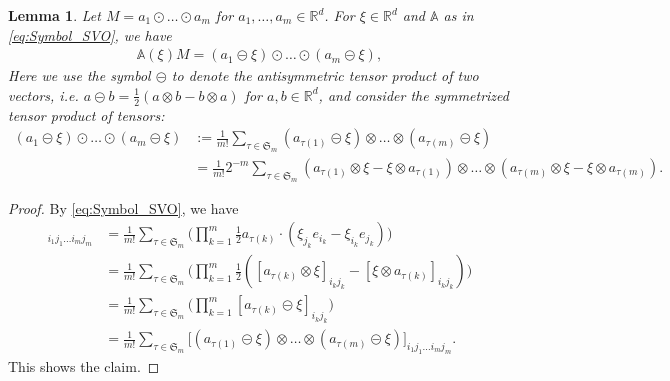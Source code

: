 \documentclass[a4paper, 10pt, twoside, notitlepage]{amsart}
\theoremstyle{plain}
\newtheorem{lem}[prop]{Lemma}
\newcommand{\R}{\mathbb{R}}
\renewcommand{\AA}{\mathbb{A}}
\begin{document}
		\begin{lem}\label{lem:SVsymb}
			Let $M = a_1 \odot \dots \odot a_m$ for $a_1,\dots,a_m \in \R^d$.  For $\xi \in \R^d$ and $\AA$ as in \eqref{eq:Symbol_SVO}, we have
			\begin{align} \label{eq:AlternativeSymbol}
                          \AA(\xi)M = (a_1 \circleddash \xi) \odot \dots \odot (a_m \circleddash \xi),
			\end{align}
			Here we use the symbol $\circleddash$ to denote the antisymmetric tensor product of two vectors, i.e.  $a \circleddash b = \frac{1}{2}( a \otimes b - b \otimes a)$ for $a,b \in \R^d$, and consider the symmetrized tensor product of tensors:
                          \begin{align*}
                            (a_1 \circleddash \xi) \odot \dots \odot (a_m \circleddash \xi) &:= \frac{1}{m!} \sum_{\tau \in \mathfrak{S}_m} (a_{\tau(1)} \circleddash \xi) \otimes \dots \otimes (a_{\tau(m)} \circleddash \xi) \\
                            & = \frac{1}{m!} 2^{-m} \sum_{\tau \in \mathfrak{S}_m} (a_{\tau(1)} \otimes \xi - \xi \otimes a_{\tau(1)}) \otimes \dots \otimes (a_{\tau(m)} \otimes \xi - \xi \otimes a_{\tau(m)}).
                        \end{align*}
                        

		\end{lem}
		
		\begin{proof}
			By \eqref{eq:Symbol_SVO}, we have
			\begin{align*}
				[\AA(\xi)M]_{i_1j_1\dots i_m j_m} & = \frac{1}{m!} \sum_{\tau \in \mathfrak{S}_m} \Big( \prod_{k=1}^m \frac{1}{2} a_{\tau(k)}\cdot (\xi_{j_k} e_{i_k} - \xi_{i_k} e_{j_k}) \Big) \\
				&= \frac{1}{m!} \sum_{\tau \in \mathfrak{S}_m} \Big( \prod_{k=1}^m \frac{1}{2} ([a_{\tau(k)} \otimes \xi]_{i_k j_k} - [\xi \otimes a_{\tau(k)}]_{i_k j_k} ) \Big) \\
				& = \frac{1}{m!} \sum_{\tau \in \mathfrak{S}_m} \Big( \prod_{k=1}^m [a_{\tau(k)} \circleddash \xi]_{i_k j_k} \Big) \\
				&= \frac{1}{m!} \sum_{\tau \in
					\mathfrak{S}_m} \Big[ (a_{\tau(1)} \circleddash \xi) \otimes \dots \otimes (a_{\tau(m)} \circleddash \xi) \Big]_{i_1 j_1 \dots i_m j_m}.
			\end{align*}
			This shows the claim.
		\end{proof}
		          
\end{document}
